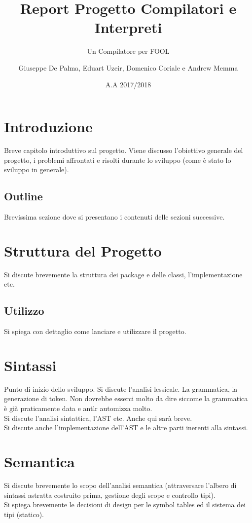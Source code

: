 \documentclass{scrreprt}
\title{Report Progetto Compilatori e Interpreti}
\subtitle{Un Compilatore per FOOL}
\date{A.A 2017/2018}
\author{Giuseppe De Palma, Eduart Uzeir, Domenico Coriale e Andrew Memma}
\begin{document}
\maketitle

\tableofcontents

\chapter{Introduzione}
Breve capitolo introduttivo sul progetto. Viene discusso l'obiettivo generale del progetto,
i problemi affrontati e risolti durante lo sviluppo (come è stato lo sviluppo in generale).

\section{Outline}
Brevissima sezione dove si presentano i contenuti delle sezioni successive.

\chapter{Struttura del Progetto}
Si discute brevemente la struttura dei package e delle classi, l'implementazione etc.
\section{Utilizzo}
Si spiega con dettaglio come lanciare e utilizzare il progetto.

\chapter{Sintassi}
Punto di inizio dello sviluppo. Si discute l'analisi lessicale. La grammatica, la generazione di token.
Non dovrebbe esserci molto da dire siccome la grammatica è già praticamente data e antlr automizza molto.\\
Si discute l'analisi sintattica, l'AST etc. Anche qui sarà breve.\\
Si discute anche l'implementazione dell'AST e le altre parti inerenti alla sintassi.

\chapter{Semantica}
Si discute brevemente lo scopo dell'analisi semantica (attraversare l'albero di sintassi astratta costruito prima, gestione
degli scope e controllo tipi).\\
Si spiega brevemente le decisioni di design per le symbol tables ed il sistema dei tipi (statico).
\end{document}
